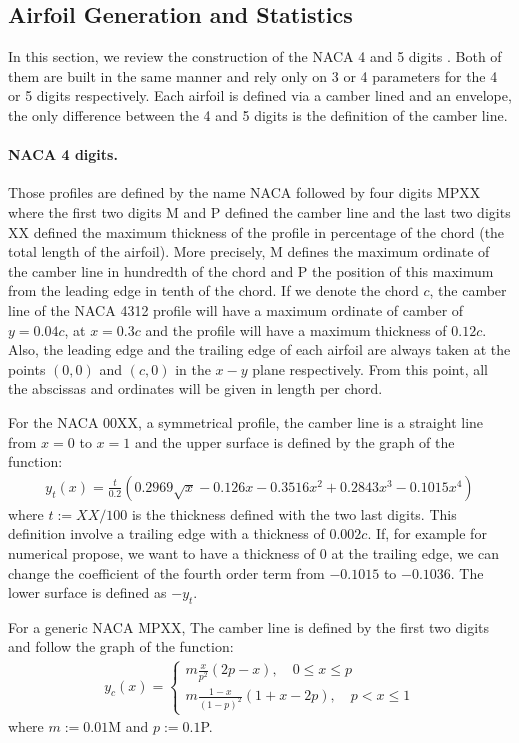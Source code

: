 \begin{subappendices}
	\section{Airfoil Generation and Statistics}\label{ap:airfoil}
	In this section, we review the construction of the NACA 4 and 5 digits \cite{naca}. Both of them are built in the same manner and rely only on 3 or 4 parameters for the 4 or 5 digits respectively. Each airfoil is defined via a camber lined and an envelope, the only difference between the 4 and 5 digits is the definition of the camber line.
	
	\paragraph{NACA 4 digits.} Those profiles are defined by the name NACA followed by four digits MPXX where the first two digits M and P defined the camber line and the last two digits XX defined the maximum thickness of the profile in percentage of the chord (the total length of the airfoil). More precisely, M defines the maximum ordinate of the camber line in hundredth of the chord and P the position of this maximum from the leading edge in tenth of the chord. If we denote the chord $c$, the camber line of the NACA 4312 profile will have a maximum ordinate of camber of $y = 0.04c$, at $x = 0.3c$ and the profile will have a maximum thickness of $0.12c$. Also, the leading edge and the trailing edge of each airfoil are always taken at the points $(0, 0)$ and $(c, 0)$ in the $x-y$ plane respectively. From this point, all the abscissas and ordinates will be given in length per chord.
	
	For the NACA 00XX, a symmetrical profile, the camber line is a straight line from $x = 0$ to $x = 1$ and the upper surface is defined by the graph of the function:
	\begin{align}
		y_t(x) = \frac{t}{0.2}\left(0.2969\sqrt{x} - 0.126x - 0.3516x^2 + 0.2843x^3 - 0.1015x^4\right)
	\end{align}
	where $t := XX/100$ is the thickness defined with the two last digits. This definition involve a trailing edge with a thickness of $0.002c$. If, for example for numerical propose, we want to have a thickness of 0 at the trailing edge, we can change the coefficient of the fourth order term from $-0.1015$ to $-0.1036$. The lower surface is defined as $-y_t$.
	
	For a generic NACA MPXX, The camber line is defined by the first two digits and follow the graph of the function:
	\begin{align}
		y_c(x) =
		\begin{cases}
			m\frac{x}{p^2}(2p - x), \quad 0 \leqslant x\leqslant p \\
			m\frac{1 - x}{(1-p)^2}(1 + x - 2p), \quad p < x \leqslant 1
		\end{cases}
	\end{align}
	where $m := 0.01$M and $p:= 0.1$P.
	

\end{subappendices}
